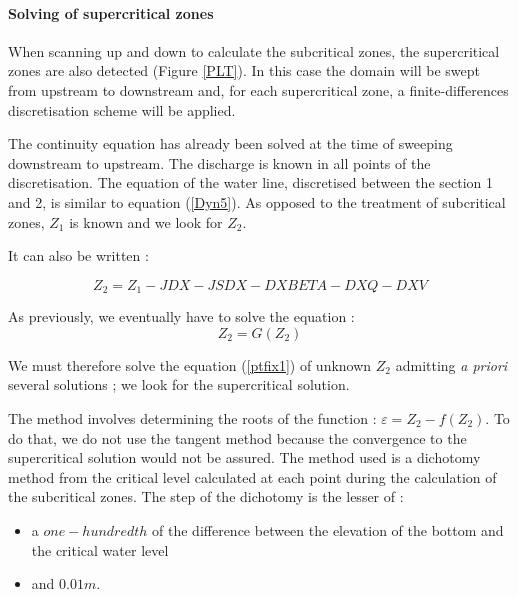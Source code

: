 \paragraph{Solving of supercritical zones\\}

\hspace*{1cm}

When scanning up and down to calculate the subcritical zones, the supercritical zones are also detected (Figure \ref{PLT}). In this case the domain will be swept from upstream to downstream and, for each supercritical zone, a finite-differences discretisation scheme will be applied.

\vspace{0.5cm}

The continuity equation has already been solved at the time of sweeping downstream to upstream. The discharge is known in all points of the discretisation. The equation of the water line, discretised between the section 1 and 2, is similar to equation (\ref{Dyn5}). As opposed to the treatment of subcritical zones, $Z_1$ is known and we look for $Z_2$. 

\vspace{0.5cm}

It can also be written :

\begin{equation}
  Z_2 = Z_1 - JDX - JSDX - DXBETA - DXQ - DXV
\end{equation}

\vspace{0.5cm}

As previously, we eventually have to solve the equation :
\begin{equation}
  \label{ptfix1}
  Z_2 = G(Z_2)
\end{equation}

\vspace{0.5cm}

We must therefore solve the equation (\ref{ptfix1}) of unknown $Z_2$ admitting \textit{a priori} several solutions ; we look for the supercritical solution.

\vspace{0.5cm}

The method involves determining the roots of the function : $\varepsilon = Z_2 - f(Z_2)$.
To do that, we do not use the tangent method because the convergence to the supercritical solution would not be assured. The method used is a dichotomy method from the critical level calculated at each point during the calculation of the subcritical zones. The step of the dichotomy is the lesser of :
\begin{itemize}
 \item a $one-hundredth$ of the difference between the elevation of the bottom and the critical water level
 \item and $0.01 m$.
\end{itemize}

